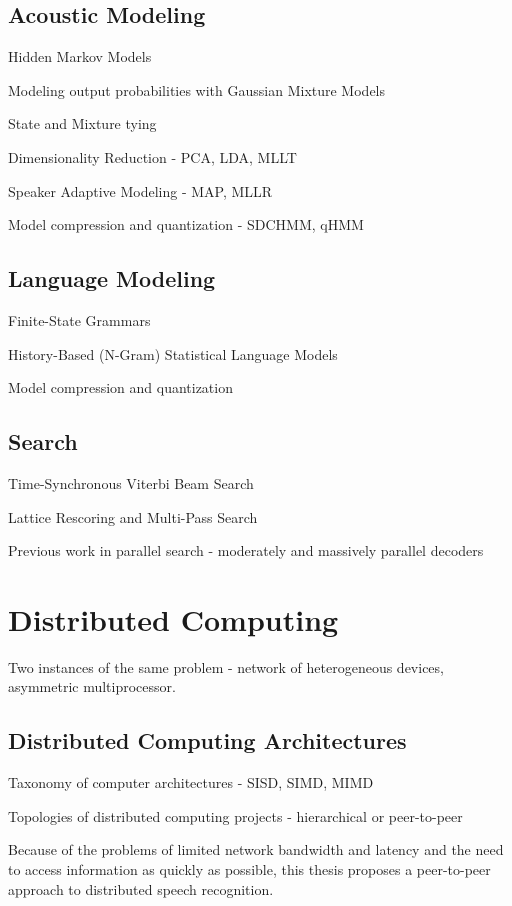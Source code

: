 \documentclass{article}
\begin{document}
\subsection{Acoustic Modeling}
\label{sec:am}

Hidden Markov Models

Modeling output probabilities with Gaussian Mixture Models

State and Mixture tying

Dimensionality Reduction - PCA, LDA, MLLT

Speaker Adaptive Modeling - MAP, MLLR

Model compression and quantization - SDCHMM, qHMM

\subsection{Language Modeling}
\label{sec:lm}

Finite-State Grammars

History-Based (N-Gram) Statistical Language Models

Model compression and quantization

\subsection{Search}
\label{sec:search}

Time-Synchronous Viterbi Beam Search

Lattice Rescoring and Multi-Pass Search

Previous work in parallel search - moderately and massively parallel decoders

\section{Distributed Computing}
\label{sec:pdc}

Two instances of the same problem - network of heterogeneous devices,
asymmetric multiprocessor.

\subsection{Distributed Computing Architectures}
\label{sec:arch}

Taxonomy of computer architectures - SISD, SIMD, MIMD

Topologies of distributed computing projects - hierarchical or peer-to-peer

Because of the problems of limited network bandwidth and latency and
the need to access information as quickly as possible, this thesis
proposes a peer-to-peer approach to distributed speech recognition.
\end{document}
